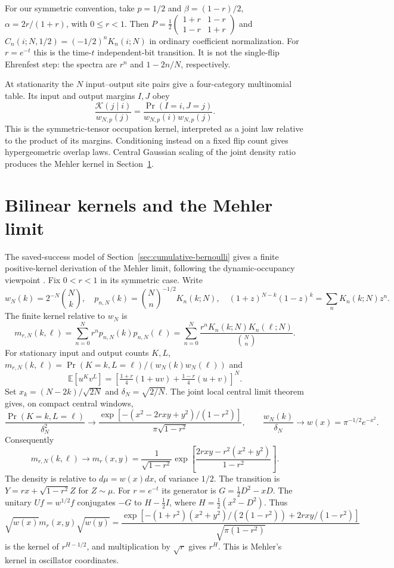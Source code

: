 \documentclass[11pt,reqno]{amsart}
\begin{document}
For our symmetric convention, take $p=1/2$ and
$\beta=(1-r)/2$, $\alpha=2r/(1+r)$, with $0\le r<1$.
Then $P=\frac12\left(\begin{smallmatrix}1+r&1-r\\1-r&1+r\end{smallmatrix}\right)$
and $C_n(i;N,1/2)=(-1/2)^nK_n(i;N)$ in ordinary coefficient
normalization. For $r=e^{-t}$ this is the time-$t$ independent-bit
transition. It is not the single-flip Ehrenfest step: the spectra are
$r^n$ and $1-2n/N$, respectively.

At stationarity the $N$ input--output site pairs give a four-category
multinomial table. Its input and output margins $I,J$ obey
\[
\frac{\mathcal K(j\mid i)}{w_{N,p}(j)}
=\frac{\Pr(I=i,J=j)}{w_{N,p}(i)w_{N,p}(j)}.
\]
This is the symmetric-tensor occupation kernel, interpreted as a joint
law relative to the product of its margins. Conditioning instead on a
fixed flip count gives hypergeometric overlap laws. Central Gaussian
scaling of the joint density ratio produces the Mehler kernel in
Section~\ref{sec:11-3}.

\section{Bilinear kernels and the Mehler limit}
\label{sec:11-3}
The saved-success model of Section~\ref{sec:cumulative-bernoulli}
gives a finite positive-kernel derivation of the Mehler limit,
following the dynamic-occupancy viewpoint
\cite{CooperHoareRahman1977,HoareRahman1984}. Fix $0<r<1$ in its
symmetric case. Write
\[
w_N(k)=2^{-N}\binom Nk,\quad
p_{n,N}(k)=\binom Nn^{-1/2}K_n(k;N),\quad
(1+z)^{N-k}(1-z)^k=\sum_nK_n(k;N)z^n.
\]
The finite kernel relative to $w_N$ is
\begin{equation}\label{eq:ency-finite-mehler}
m_{r,N}(k,\ell)=\sum_{n=0}^Nr^np_{n,N}(k)p_{n,N}(\ell)
=\sum_{n=0}^N\frac{r^nK_n(k;N)K_n(\ell;N)}{\binom Nn}.
\end{equation}
For stationary input and output counts $K,L$,
$m_{r,N}(k,\ell)=\Pr(K=k,L=\ell)/(w_N(k)w_N(\ell))$ and
\[
\mathbb E[u^Kv^L]=
\left[\tfrac{1+r}{4}(1+uv)+\tfrac{1-r}{4}(u+v)\right]^N.
\]
Set $x_k=(N-2k)/\sqrt{2N}$ and $\delta_N=\sqrt{2/N}$.
The joint local central limit theorem gives, on compact central windows,
\[
\frac{\Pr(K=k,L=\ell)}{\delta_N^2}\longrightarrow
\frac{\exp[-(x^2-2rxy+y^2)/(1-r^2)]}{\pi\sqrt{1-r^2}},
\qquad \frac{w_N(k)}{\delta_N}\longrightarrow
w(x)=\pi^{-1/2}e^{-x^2}.
\]
Consequently
\begin{equation}\label{eq:ency-mehler-ratio}
m_{r,N}(k,\ell)\longrightarrow m_r(x,y)
=\frac1{\sqrt{1-r^2}}
\exp\left[\frac{2rxy-r^2(x^2+y^2)}{1-r^2}\right].
\end{equation}
The density is relative to $d\mu=w(x)dx$, of variance $1/2$.
The transition is $Y=rx+\sqrt{1-r^2}Z$ for $Z\sim\mu$.
For $r=e^{-t}$ its generator is $G=\frac12D^2-xD$.
The unitary $Uf=w^{1/2}f$ conjugates $-G$ to
$H-\frac12I$, where $H=\frac12(x^2-D^2)$. Thus
\[
\sqrt{w(x)}m_r(x,y)\sqrt{w(y)}
=\frac{\exp[-(1+r^2)(x^2+y^2)/(2(1-r^2))+2rxy/(1-r^2)]}
{\sqrt{\pi(1-r^2)}}
\]
is the kernel of $r^{H-1/2}$, and multiplication by $\sqrt r$ gives
$r^H$. This is Mehler's kernel in oscillator coordinates.
\end{document}
